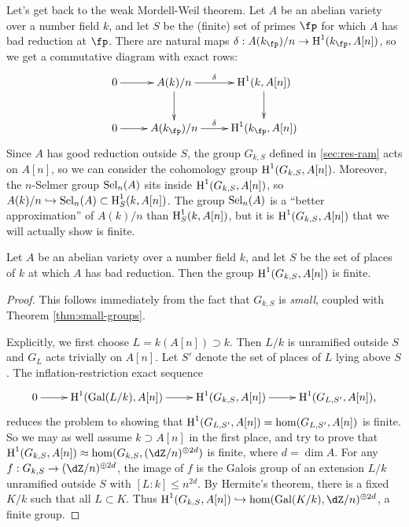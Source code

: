 Let's get back to the weak Mordell-Weil theorem. Let $A$ be an abelian variety 
over a number field $k$, and let $S$ be the (finite) set of primes $\fp$ for 
which $A$ has bad reduction at $\fp$. There are natural maps 
$\delta:A(k_\fp)/n \to\h^1(k_\fp,A[n])$, so we get a commutative diagram with 
exact rows: 
\[\xymatrix{
  0 \ar[r] 
    & A(k)/n \ar[r]^-\delta \ar[d]
    & \h^1(k,A[n]) \ar[d] \\
  0 \ar[r]
    & A(k_\fp)/n \ar[r]^-\delta 
    & \h^1(k_\fp,A[n])
}\]
Since $A$ has good reduction outside $S$, the group $G_{k,S}$ defined in 
\ref{sec:res-ram} acts on $A[n]$, so we can consider the cohomology group 
$\operatorname{H}^1(G_{k,S},A[n])$. Moreover, the $n$-Selmer group 
$\operatorname{Sel}_n(A)$ sits inside $\operatorname{H}^1(G_{k,S},A[n])$, so 
$A(k)/n\hookrightarrow \operatorname{Sel}_n(A)\subset \operatorname{H}_S^1(k,A[n])$. The group 
$\operatorname{Sel}_n(A)$ is a ``better approximation'' of $A(k)/n$ than $\operatorname{H}_S^1(k,A[n])$, 
but it is $\operatorname{H}^1(G_{k,S},A[n])$ that we will actually show is finite. 

\begin{theorem}
Let $A$ be an abelian variety over a number field $k$, and let 
$S$ be the set of places of $k$ at which $A$ has bad reduction. Then the group 
$\operatorname{H}^1(G_{k,S},A[n])$ is finite.
\end{theorem}
\begin{proof}
This follows immediately from the fact that $G_{k,S}$ is \emph{small}, coupled 
with Theorem \ref{thm:small-groups}. 

Explicitly, we first choose $L=k(A[n])\supset k$. Then $L/k$ 
is unramified outside $S$ and $G_L$ acts 
trivially on $A[n]$. Let $S'$ denote the set of places of $L$ lying above $S$. 
The inflation-restriction exact sequence 
\[\xymatrix{
  0 \ar[r] 
    & \h^1(\gal(L/k),A[n]) \ar[r] 
    & \h^1(G_{k,S},A[n]) \ar[r] 
    & \h^1(G_{L,S'},A[n]) \text{,} 
}\]
reduces the problem to showing that $\operatorname{H}^1(G_{L,S'},A[n]) = \hom(G_{L,S'},A[n])$ 
is finite. So we may as well assume $k\supset A[n]$ in the first place, and 
try to prove that 
$\h^1(G_{k,S},A[n]) \approx \hom(G_{k,S},(\dZ/n)^{\oplus 2 d})$ is finite, 
where $d=\dim A$. For any $f:G_{k,S} \to (\dZ/n)^{\oplus 2 d}$, the image of 
$f$ is the Galois group of an extension $L/k$ unramified outside $S$ with 
$[L:k]\leqslant n^{2 d}$. By Hermite's theorem, there is a fixed $K/k$ such 
that all $L\subset K$. Thus 
$\h^1(G_{k,S},A[n])\hookrightarrow \hom(\gal(K/k),\dZ/n)^{\oplus 2 d}$, a 
finite group.
\end{proof} 

